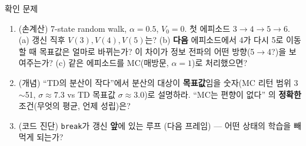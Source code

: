 \begin{frame}{확인 문제}
  \small
  \begin{enumerate}
    \item (손계산) 7-state random walk, $\alpha = 0.5$, $V_0 = 0$.
      첫 에피소드 $3\to4\to5\to6$. (a) 갱신 직후 $V(3),V(4),V(5)$는?
      (b) \textbf{다음} 에피소드에서 4가 다시 5로 이동할 때 목표값은
      얼마로 바뀌는가? 이 차이가 정보 전파의 어떤 방향(5$\to$4?)을
      보여주는가? (c) 같은 에피소드를 MC(매방문, $\alpha=1$)로
      처리했으면?
    \item (개념) ``TD의 분산이 작다''에서 분산의 대상이
      \textbf{목표값}임을 숫자(MC 리턴 범위 3$\sim$51, $\sigma\approx7.3$
      vs TD 목표값 $\sigma\approx3.0$)로 설명하라. ``MC는 편향이 없다''
      의 \textbf{정확한} 조건(무엇의 평균, 언제 성립)은?
    \item (코드 진단) \texttt{break}가 갱신 \textbf{앞}에 있는 루프
      (다음 프레임) --- 어떤 상태의 학습을 빼먹게 되는가?
  \end{enumerate}
\end{frame}

